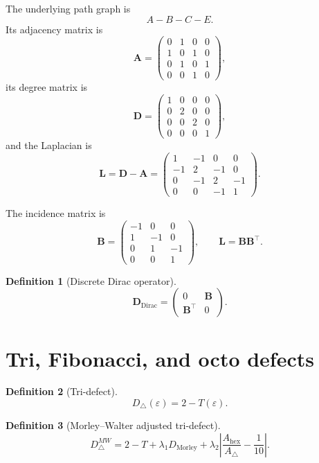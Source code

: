 \documentclass[11pt,a4paper]{article}
\newtheorem{definition}{Definition}[section]
\begin{document}
	The underlying path graph is
	\[
	A-B-C-E.
	\]
	Its adjacency matrix is
	\[
	\mathbf A=
	\begin{pmatrix}
		0&1&0&0\\
		1&0&1&0\\
		0&1&0&1\\
		0&0&1&0
	\end{pmatrix},
	\]
	its degree matrix is
	\[
	\mathbf D=
	\begin{pmatrix}
		1&0&0&0\\
		0&2&0&0\\
		0&0&2&0\\
		0&0&0&1
	\end{pmatrix},
	\]
	and the Laplacian is
	\[
	\mathbf L=\mathbf D-\mathbf A
	=
	\begin{pmatrix}
		1&-1&0&0\\
		-1&2&-1&0\\
		0&-1&2&-1\\
		0&0&-1&1
	\end{pmatrix}.
	\]
	
	The incidence matrix is
	\[
	\mathbf B=
	\begin{pmatrix}
		-1&0&0\\
		1&-1&0\\
		0&1&-1\\
		0&0&1
	\end{pmatrix},
	\qquad
	\mathbf L=\mathbf B\mathbf B^\top.
	\]
	
	\begin{definition}[Discrete Dirac operator]
		\[
		\mathbf D_{\mathrm{Dirac}}=
		\begin{pmatrix}
			0 & \mathbf B\\
			\mathbf B^\top & 0
		\end{pmatrix}.
		\]
	\end{definition}
	
	\section{Tri, Fibonacci, and octo defects}
	
	\begin{definition}[Tri-defect]
		\[
		D_\triangle(\varepsilon)=2-T(\varepsilon).
		\]
	\end{definition}
	
	\begin{definition}[Morley--Walter adjusted tri-defect]
		\[
		D_\triangle^{MW}
		=
		2-T
		+\lambda_1 D_{\mathrm{Morley}}
		+\lambda_2\left|
		\frac{A_{\mathrm{hex}}}{A_\triangle}-\frac1{10}
		\right|.
		\]
	\end{definition}
	
\end{document}
